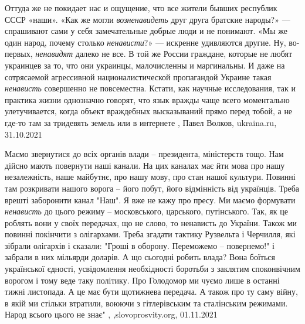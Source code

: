 Оттуда же не покидает нас и ощущение, что все жители бывших республик СССР
«наши». «Как же могли \emph{возненавидеть} друг друга братские народы?» —
спрашивают сами у себя замечательные добрые люди и не понимают. «Мы же один
народ, почему столько \emph{ненависти}?» — искренне удивляются другие.  Ну,
во-первых, \emph{ненавидят} далеко не все. В той же России граждане, которые не
любят украинцев за то, что они украинцы, малочисленны и маргинальны. И даже на
сотрясаемой агрессивной националистической пропагандой Украине такая
\emph{ненависть} совершенно не повсеместна. Кстати, как научные исследования,
так и практика жизни однозначно говорят, что язык вражды чаще всего моментально
улетучивается, когда объект враждебных высказываний прямо перед тобой, а не
где-то там за тридевять земель или в интернете
, Павел Волков, ukraina.ru, 31.10.2021

Маємо звернутися до всіх органів влади – президента, міністерств тощо. Нам
дійсно мають повернути наші канали. На цих каналах має йти мова про нашу
незалежність, наше майбутнє, про нашу мову, про стан нашої культури. Повинні
там розкривати нашого ворога – його побут, його відмінність від українців.
Треба врешті заборонити канал "Наш". Я вже не кажу про пресу. Ми маємо
формувати \emph{ненависть} до цього режиму – московського, царського, путінського.
Так, як це роблять вони у своїх передачах, що не слово, то ненависть до
України.  Також ми повинні покінчити з олігархами. Треба згадати тактику
Рузвельта і Черчилля, які зібрали олігархів і сказали: "Гроші в оборону.
Переможемо – повернемо!" і забрали в них мільярди доларів.  А що сьогодні
робить влада? Вона боїться української єдності, усвідомлення необхідності
боротьби з заклятим споконвічним ворогом і тому веде таку політику.  Про
Голодомор ми чуємо лише в останні тижні листопада. А це має бути щотижнева
передача. А також про ту саму війну, в якій ми стільки втратили, воюючи з
гітлерівським та сталінським режимами. Народ всього цього не знає"
, ,slovoprosvity.org, 01.11.2021
